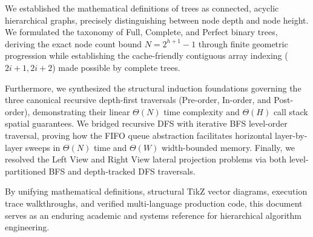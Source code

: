 \documentclass[10pt,journal,compsoc,onecolumn]{IEEEtran}
\begin{document}
We established the mathematical definitions of trees as connected, acyclic hierarchical graphs, precisely distinguishing between node depth and node height. We formulated the taxonomy of Full, Complete, and Perfect binary trees, deriving the exact node count bound $N = 2^{h+1} - 1$ through finite geometric progression while establishing the cache-friendly contiguous array indexing ($2i + 1, 2i + 2$) made possible by complete trees.

Furthermore, we synthesized the structural induction foundations governing the three canonical recursive depth-first traversals (Pre-order, In-order, and Post-order), demonstrating their linear $\Theta(N)$ time complexity and $\Theta(H)$ call stack spatial guarantees. We bridged recursive DFS with iterative BFS level-order traversal, proving how the FIFO queue abstraction facilitates horizontal layer-by-layer sweeps in $\Theta(N)$ time and $\Theta(W)$ width-bounded memory. Finally, we resolved the Left View and Right View lateral projection problems via both level-partitioned BFS and depth-tracked DFS traversals.

By unifying mathematical definitions, structural TikZ vector diagrams, execution trace walkthroughs, and verified multi-language production code, this document serves as an enduring academic and systems reference for hierarchical algorithm engineering.
\end{document}
